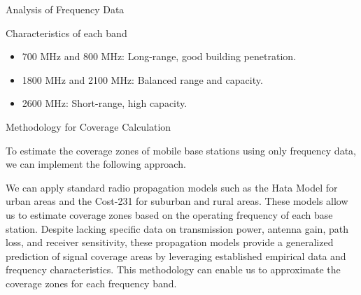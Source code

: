 \begin{frame}{Analysis of Frequency Data}
    \begin{block}{Characteristics of each band}
        \begin{itemize}
            \item 700 MHz and 800 MHz: Long-range, good building penetration.
            \item 1800 MHz and 2100 MHz: Balanced range and capacity.
            \item 2600 MHz: Short-range, high capacity.
        \end{itemize}
    \end{block}

    \begin{block}{Methodology for Coverage Calculation}
        \begin{itemize}
            To estimate the coverage zones of mobile base stations using only frequency data, we can implement the following approach. 
            
            We can apply standard radio propagation models such as the Hata Model for urban areas and the Cost-231 for suburban and rural areas. These models allow us to estimate coverage zones based on the operating frequency of each base station. Despite lacking specific data on transmission power, antenna gain, path loss, and receiver sensitivity, these propagation models provide a generalized prediction of signal coverage areas by leveraging established empirical data and frequency characteristics. This methodology can enable us to approximate the coverage zones for each frequency band.
        \end{itemize}
    \end{block}
\end{frame}

